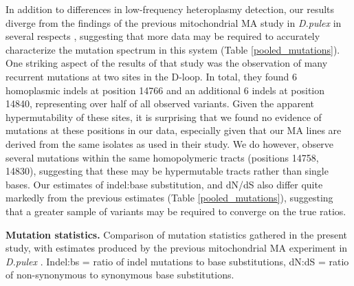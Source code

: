 \documentclass[12pt,twoside]{reedthesis}
\begin{document}
In addition to differences in low-frequency heteroplasmy detection, our results diverge from the findings of the previous mitochondrial \gls{MA} study in \textit{D.pulex} in several respects \citep{xu_high_2012}, suggesting that more data may be required to accurately characterize the mutation spectrum in this system (Table \ref{pooled_mutations}).
One striking aspect of the results of that study was the observation of many recurrent mutations at two sites in the D-loop.
In total, they found 6 homoplasmic \gls{indels} at position 14766 and an additional 6 \gls{indels} at position 14840, representing over half of all observed variants.
Given the apparent hypermutability of these sites, it is surprising that we found no evidence of mutations at these positions in our data, especially given that our \gls{MA} lines are derived from the same isolates as used in their study. 
We do however, observe several mutations within the same homopolymeric tracts (positions 14758, 14830), suggesting that these may be hypermutable tracts rather than single bases. 
Our estimates of indel:base substitution, and dN/dS also differ quite markedly from the previous estimates (Table \ref{pooled_mutations}), suggesting that a greater sample of variants may be required to converge on the true ratios.

\begin{table}[h!]
    \caption[Mutation Statistics]{\textbf{Mutation statistics.} Comparison of mutation statistics gathered in the present study, with estimates produced by the previous mitochondrial \gls{MA} experiment in \textit{D.pulex} \citep{xu_high_2012}. Indel:bs = ratio of indel mutations to base substitutions, dN:dS = ratio of non-synonymous to synonymous base substitutions.}
    \begin{center}
        \label{pooled_mutations}
    \end{center}
\end{table}
\end{document}

